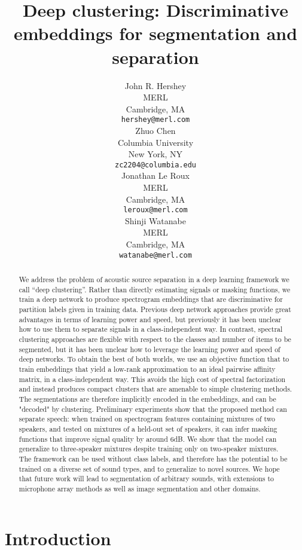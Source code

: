 \documentclass[9pt]{article} \usepackage{nips15submit_e,times}
\title{Deep clustering: Discriminative embeddings for segmentation and separation}
\author{
	John R. Hershey\\
	MERL\\
	Cambridge, MA\\
	\texttt{hershey@merl.com} \\
	\And
	Zhuo Chen\\Columbia University\\
	New York, NY\\
	\texttt{zc2204@columbia.edu} \\
	\AND
	Jonathan Le Roux\\
	MERL\\
	Cambridge, MA\\
	\texttt{leroux@merl.com} \\
	\And
	Shinji Watanabe\\
	MERL\\
	Cambridge, MA\\
	\texttt{watanabe@merl.com} \\
}
\begin{document}
\maketitle

\begin{abstract} 
We address the problem of acoustic source separation in a deep learning framework we call ``deep clustering''.   Rather than directly estimating signals or masking functions, we train a deep network to produce spectrogram embeddings that are discriminative for partition labels given in training data.   Previous deep network approaches provide great advantages in terms of learning power and speed, but previously it has been unclear how to use them to  separate signals in a class-independent way. In contrast, spectral clustering approaches are flexible with respect to the classes and number of items to be segmented, but it has been unclear how to leverage the learning power and speed of deep networks. To obtain the best of both worlds, we use an objective function that to train embeddings that yield a low-rank approximation to an ideal pairwise affinity matrix, in a class-independent way.   This avoids the high cost of spectral factorization and instead produces compact clusters that are amenable to simple clustering methods.   The segmentations are therefore implicitly encoded in the embeddings, and can be "decoded" by clustering. Preliminary experiments show that the proposed method can separate speech: when trained on spectrogram features containing mixtures of two speakers, and tested on mixtures of a held-out set of speakers, it can infer masking functions that improve signal quality by around 6dB.  We show that the model can generalize to three-speaker mixtures despite training only on two-speaker mixtures.   The framework can be used without class labels, and therefore has the potential to be trained on a diverse set of sound types, and to generalize to novel sources.    We hope that future work will lead to segmentation of arbitrary sounds, with extensions to microphone array methods as well as image segmentation and other domains.
\end{abstract} 
\section{Introduction}
\label{sec:intro}
\end{document}

